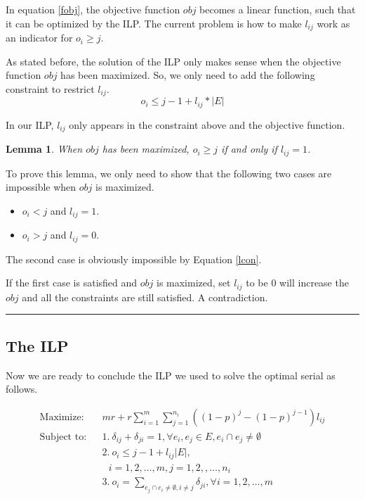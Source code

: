 \documentclass[letterpaper]{article}
\newenvironment{proof}{{Proof:}}{\hfill\rule{2mm}{2mm}}
\newtheorem{lemma}{Lemma}
\begin{document}
In equation \ref{fobj}, the objective function $obj$ becomes a linear function, such that it can be optimized by the ILP.
The current problem is how to make $l_{ij}$ work as an indicator for $o_i\geq j$.

As stated before, the solution of the ILP only makes sense when the objective function $obj$ has been maximized.
So, we only need to add the following constraint to restrict $l_{ij}$.
\begin{equation}
o_i\leq j-1+l_{ij}*|E|\label{lcon}
\end{equation}

In our ILP, $l_{ij}$ only appears in the constraint above and the objective function.

\begin{lemma}\label{lmm}
	When $obj$ has been maximized, $o_i\geq j$ if and only if $l_{ij}=1$.
\end{lemma}
\begin{proof}
	To prove this lemma, we only need to show that the following two cases are impossible when $obj$ is maximized.
	\begin{itemize}
		\item $o_i<j$ and $l_{ij}=1$.
		\item $o_i>j$ and $l_{ij}=0$.
	\end{itemize}
	The second case is obviously impossible by Equation \ref{lcon}.
	
	If the first case is satisfied and $obj$ is maximized, set $l_{ij}$ to be 0 will increase the $obj$ and all the constraints are still satisfied. A contradiction.
\end{proof}

\subsection{The ILP}
Now we are ready to conclude the ILP we used to solve the optimal serial as follows.

\begin{eqnarray}
\text{Maximize:}&& mr+r\sum_{i=1}^{m}\sum_{j=1}^{n_i}((1-p)^j-(1-p)^{j-1})l_{ij}\label{stobj}\\
\text{Subject to:}&& 1.~\delta_{ij}+\delta_{ji}=1, \forall e_i,e_j\in E, e_i\cap e_j\neq \emptyset \label{con1}\\
&& 2.~o_i\leq j-1+l_{ij}|E|,\nonumber\\&&~~~i=1,2,\ldots,m, j=1,2,,\ldots,n_i\label{ni}\\
&& 3.~o_i=\sum_{e_j\cap e_i\neq \emptyset,i\neq j}\delta_{ji}, \forall i=1,2,\ldots,m \label{oo}
\end{eqnarray}
\end{document}
